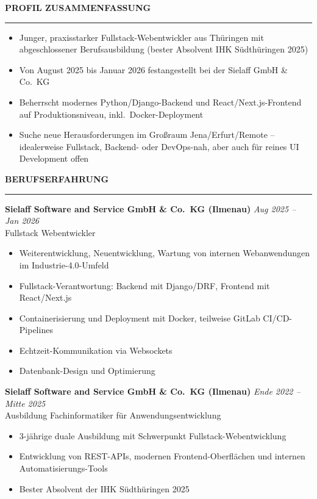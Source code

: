 \documentclass[a4paper, 11pt]{article}
\newcommand{\cvsection}[1]{%
  \vspace{0.4cm}%
  {\large\bfseries\MakeUppercase{#1}}\\[-0.1cm]%
  \rule{\linewidth}{0.4pt}%
  \vspace{0.15cm}%
}
\begin{document}
\hfill
\begin{minipage}[t]{0.52\textwidth}
\vspace{0pt}

\cvsection{Profil Zusammenfassung}
\begin{itemize}
  \item Junger, praxisstarker Fullstack-Webentwickler aus Thüringen mit abgeschlossener Berufsausbildung (bester Absolvent IHK Südthüringen 2025)
  \item Von August 2025 bis Januar 2026 festangestellt bei der Sielaff GmbH \& Co.\ KG
  \item Beherrscht modernes Python/Django-Backend und React/Next.js-Frontend auf Produktionsniveau, inkl.\ Docker-Deployment
  \item Suche neue Herausforderungen im Großraum Jena/Erfurt/Remote -- idealerweise Fullstack, Backend- oder DevOps-nah, aber auch für reines UI Development offen
\end{itemize}

\cvsection{Berufserfahrung}

\textbf{Sielaff Software and Service GmbH \& Co.\ KG (Ilmenau)}
\hfill \textit{Aug 2025 -- Jan 2026}\\
Fullstack Webentwickler
\begin{itemize}
  \item Weiterentwicklung, Neuentwicklung, Wartung von internen Webanwendungen im Industrie-4.0-Umfeld
  \item Fullstack-Verantwortung: Backend mit Django/DRF, Frontend mit React/Next.js
  \item Containerisierung und Deployment mit Docker, teilweise GitLab CI/CD-Pipelines
  \item Echtzeit-Kommunikation via Websockets
  \item Datenbank-Design und Optimierung
\end{itemize}

\vspace{0.35cm}

\textbf{Sielaff Software and Service GmbH \& Co.\ KG (Ilmenau)}
\hfill \textit{Ende 2022 -- Mitte 2025}\\
Ausbildung Fachinformatiker für Anwendungsentwicklung
\begin{itemize}
  \item 3-jährige duale Ausbildung mit Schwerpunkt Fullstack-Webentwicklung
  \item Entwicklung von REST-APIs, modernen Frontend-Oberflächen und internen Automatisierungs-Tools
  \item Bester Absolvent der IHK Südthüringen 2025
\end{itemize}

\end{minipage}
\end{document}
